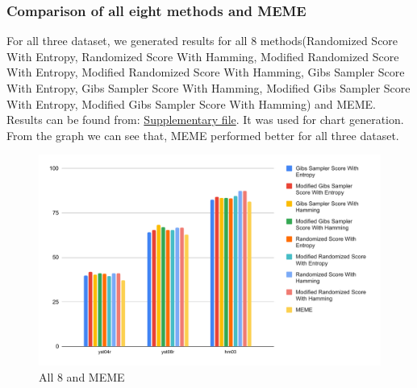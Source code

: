 \documentclass{article}
\begin{document}
\subsubsection{Comparison of all eight methods and MEME}
For all three dataset, we generated results for all 8 methods(Randomized Score With Entropy, Randomized Score With Hamming, Modified Randomized Score With Entropy, Modified Randomized Score With Hamming, Gibs Sampler Score With Entropy, Gibs Sampler Score With Hamming, Modified Gibs Sampler Score With Entropy, Modified Gibs Sampler Score With Hamming) and MEME. Results can be found from: \href{https://docs.google.com/spreadsheets/d/1NLuWuYod4BafkorDmi3lj8y2_z9ZDeY42Y-eZODlBIA/edit#gid=1549331190}{Supplementary file}. It was used for chart generation.\\
From the graph we can see that, MEME performed better for all three dataset.
\begin{figure}[!hptb]
    \centering
    \includegraphics[scale=0.7]{Figs/chart_MEME.pdf}
    \caption{All 8 and MEME}    
\end{figure}
\clearpage
\end{document}

